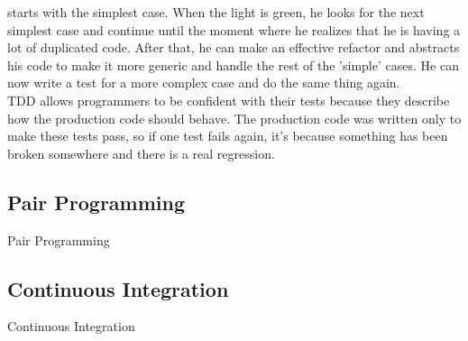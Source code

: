 starts with the simplest case.
When the light is green, he looks for the next simplest case and continue
until the moment where he realizes that he is having a lot of duplicated
code.
After that, he can make an effective refactor and abstracts his code to make
it more generic and handle the rest of the 'simple' cases.
He can now write a test for a more complex case and do the same thing again.
\\
\newline
TDD allows programmers to be confident with their tests because they
describe how the production code should behave.
The production code was written only to make these tests pass, so if one test
fails again, it's because something has been broken somewhere and there is a
real regression.

\subsection{Pair Programming}\label{subsec:pair-programming}
Pair Programming

\subsection{Continuous Integration}\label{subsec:continuous-integration}
Continuous Integration
